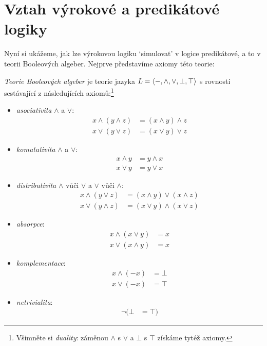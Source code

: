 \section{Vztah výrokové a predikátové logiky}
\label{section:relationship-propositional-predicate-logic}

Nyní si ukážeme, jak lze výrokovou logiku `simulovat' v logice predikátové, a to v teorii Booleových algeber. Nejprve představíme axiomy této teorie:

\begin{definition}
    \emph{Teorie Booleových algeber} je teorie jazyka $L=\langle -,{\land},{\lor},\bot,\top\rangle$ s rovností sestávající z následujících axiomů:\footnote{Všimněte si \emph{duality}: záměnou $\land$ s $\lor$ a $\bot$ s $\top$ získáme tytéž axiomy.}
    \begin{multicols}{2}
        \begin{itemize}
            \item \emph{asociativita} $\land$ a $\lor$:
            \begin{align*}
                x\land(y\land z) &=(x\land y)\land z\\
                x\lor(y\lor z) &=(x\lor y)\lor z
            \end{align*}
            \item \emph{komutativita} $\land$ a $\lor$:
            \begin{align*}
                x\land y &= y\land x\\
                x\lor y &= y\lor x
            \end{align*}
            \item \emph{distributivita} $\land$ vůči $\lor$ a $\lor$ vůči $\land$:
            \begin{align*}
                x\land(y\lor z) &= (x\land y)\lor (x\land z)\\
                x\lor(y\land z) &= (x\lor y)\land (x\lor z)
            \end{align*}
            \item \emph{absorpce}:
            \begin{align*}
                x\land(x\lor y) &= x\\
                x\lor(x\land y) &= x
            \end{align*}
            \item \emph{komplementace}:
            \begin{align*}
                x\land(-x) &= \bot \\
                x\lor(-x) &= \top
            \end{align*}
            \item \emph{netrivialita}:
            \begin{align*}
                \neg (\bot &= \top)
            \end{align*}


\end{itemize}
\end{multicols}
\end{definition}
